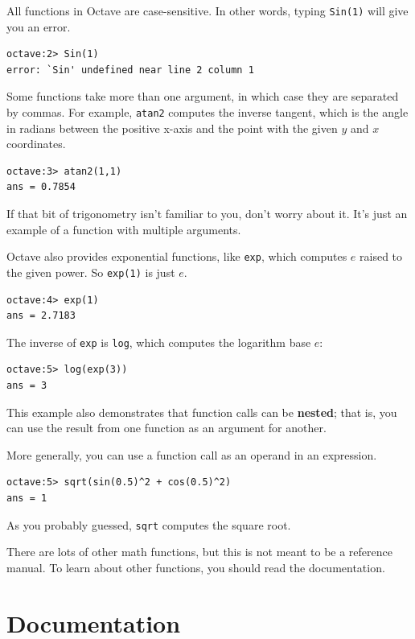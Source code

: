 \documentclass{book}
\begin{document}
All functions in Octave are case-sensitive. In other words, typing {\tt Sin(1)}
will give you an error.

\begin{verbatim}
octave:2> Sin(1)
error: `Sin' undefined near line 2 column 1
\end{verbatim}

Some functions take more than one argument, in which case they are
separated by commas. For example, {\tt atan2} computes the inverse
tangent, which is the angle in radians between the positive x-axis and
the point with the given $y$ and $x$ coordinates.

\begin{verbatim}
octave:3> atan2(1,1)
ans = 0.7854
\end{verbatim}

If that bit of trigonometry isn't familiar to you, don't worry about
it. It's just an example of a function with multiple arguments.

Octave also provides exponential functions, like {\tt exp}, which
computes $e$ raised to the given power. So {\tt exp(1)} is just $e$.

\begin{verbatim}
octave:4> exp(1)
ans = 2.7183
\end{verbatim}

The inverse of {\tt exp} is {\tt log}, which computes the logarithm
base $e$:

\begin{verbatim}
octave:5> log(exp(3))
ans = 3
\end{verbatim}

This example also demonstrates that function calls can be {\bf nested};
that is, you can use the result from one function as an argument for
another.

More generally, you can use a function call as an operand in an expression.

\begin{verbatim}
octave:5> sqrt(sin(0.5)^2 + cos(0.5)^2)
ans = 1
\end{verbatim}

As you probably guessed, {\tt sqrt} computes the square root.

There are lots of other math functions, but this is not meant to
be a reference manual. To learn about other functions, you should
read the documentation.


\section{Documentation}
\end{document}
